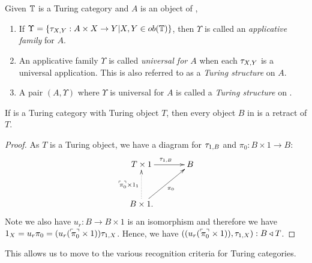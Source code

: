 \begin{definition}\label{def:turing_structure}
  Given $\mathbb{T}$ is a Turing category and $A$ is an object of \T,
  \begin{enumerate}
    \item If $\Upsilon=\{\tau_{{X},{Y}}: A\times X \to Y | X,Y \in ob(\mathbb{T})\}$, then $\Upsilon$ is called an
      \emph{applicative family} for $A$.
    \item An applicative family $\Upsilon$ is called \emph{universal for $A$} when each $\tau_{{X},{Y}}$ is
      a universal application. This is also referred to as a \emph{Turing structure} on $A$.
    \item A pair $(A,\Upsilon)$ where $\Upsilon$ is universal for $A$ is called a \emph{Turing
      structure} on \T.
  \end{enumerate}
\end{definition}

\begin{lemma}\label{lem:turing_object_is_retractable}
  If \T is a Turing category with Turing object $T$, then every object $B$ in \T is a retract of
  $T$.
\end{lemma}
\begin{proof}
  As $T$ is a Turing object, we have a diagram for $\tau_{{1},{B}}$ and $\pi_0:B\times 1 \to B$:
  \[
    \xymatrix@C+10pt@R+10pt{
      T\times 1 \ar[r]^{\tur{1}{B}} & B \\
      B\times 1. \ar@{.>}[u]^{\code{\pi_0}\times 1_1} \ar[ur]_{\pi_0}
    }
  \]
  Note we also have $u_r:B\to B\times 1$ is an
  isomorphism and therefore we have $1_X = u_r \pi_0 = (u_r ({}^\ulcorner\!\!\pi_0^\urcorner\times 1)) \tau_{{1},{X}}$. Hence, we
  have $((u_r ({}^\ulcorner\!\!\pi_0^\urcorner\times 1)), \tau_{{1},{X}}):B \triangleleft T$.
\end{proof}

This allows us to move to the various recognition criteria for Turing categories.

